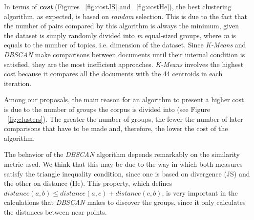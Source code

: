 In terms of \textbf{\textit{cost}} (Figures ~\ref{fig:costJS} and ~\ref{fig:costHe}), the best clustering algorithm, as expected, is based on \textit{random} selection. This is due to the fact that the number of pairs compared by this algorithm is always the minimum, given the dataset is simply randomly divided into \textit{m} equal-sized groups, where \textit{m} is equals to the number of topics, i.e. dimension of the dataset. Since \textit{K-Means} and \textit{DBSCAN} make comparisons between documents until their internal condition is satisfied, they are the most inefficient approaches. \textit{K-Means} involves the highest cost because it compares all the documents with the 44 centroids in each iteration.

Among our proposals, the main reason for an algorithm to present a higher cost is due to the number of groups the corpus is divided into (see Figure ~\ref{fig:clusters}). The greater the number of groups, the fewer the number of later comparisons that have to be made and, therefore, the lower the cost of the algorithm.

The behavior of the \textit{DBSCAN} algorithm depends remarkably on the similarity metric used. We think that this may be due to the way in which both measures satisfy the triangle inequality condition, since one is based on divergence (JS) and the other on distance (He). This property, which defines $distance(a,b) \leq distance(a,c) + distance(c,b)$, is very important in the calculations that \textit{DBSCAN} makes to discover the groups, since it only calculates the distances between near points.

